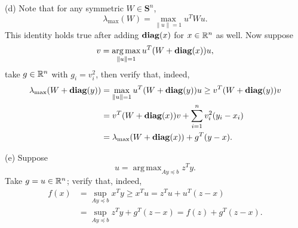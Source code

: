 \documentclass[12pt,a4paper]{article}
\newcommand{\SUM}[2]{\sum\limits_{#1}^{#2}}
\DeclareMathOperator*{\argmax}{arg\,max}
\def\R{\ifmmode\mathbb R\fi}
\def\vS{\mathbf{S}}
\def\diag{\mbox{\textbf{diag}}}
\begin{document}
\noindent(d) Note that for any symmetric $W \in \vS^n$, 
$$\lambda_{\max}(W) = \max_{\|u\|=1} u^T W u.$$
This identity holds true after adding $\diag(x)$ for $x\in\R^n$ as well.
Now suppose 
$$v = \argmax_{\|u\|=1} u^T(W + \diag(x))u,$$
take $g \in \R^n$ with $g_i = v_i^2$, then verify that, indeed,
\begin{align*}
\lambda_{\max}(W + \diag(y)) & = \max_{\|u\|=1} u^T (W + \diag(y)) u \geq v^T (W + \diag(y)) v \\
                             & = v^T (W + \diag(x)) v + \SUM{i=1}n v_i^2(y_i - x_i) \\
                             & = \lambda_{\max}(W + \diag(x)) + g^T(y-x).
\end{align*}

\noindent(e) Suppose 
$$u = \argmax_{Ay \preceq b} z^Ty.$$
Take $g = u \in \R^n$; verify that, indeed,
\begin{align*}
  f(x) &= \sup_{Ay \preceq b} x^Ty \geq x^Tu = z^Tu + u^T(z-x) \\
       &= \sup_{Ay \preceq b} z^Ty + g^T(z-x) = f(z) + g^T(z-x).
\end{align*}
\end{document}
